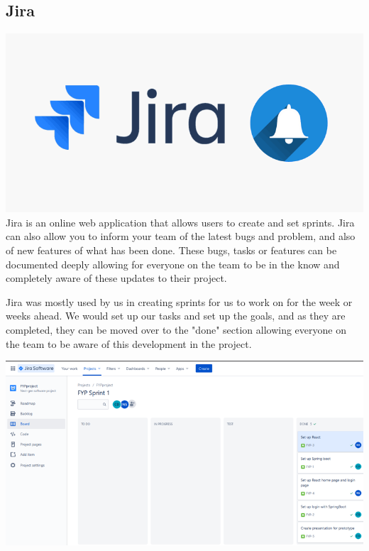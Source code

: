 \subsection{Jira}
\includegraphics[scale=0.4]{img/jira.png}\newline
Jira is an online web application that allows users to create and set sprints. Jira can also allow you to inform your team of the latest bugs and problem, and also of new features of what has been done. These bugs, tasks or features can be documented deeply allowing for everyone on the team to be in the know and completely aware of these updates to their project. \par
Jira was mostly used by us in creating sprints for us to work on for the week or weeks ahead. We would set up our tasks and set up the goals, and as they are completed, they can be moved over to the "done" section allowing everyone on the team to be aware of this development in the project. \par
\includegraphics[scale=0.7]{img/jira-sprint.PNG}\newline


